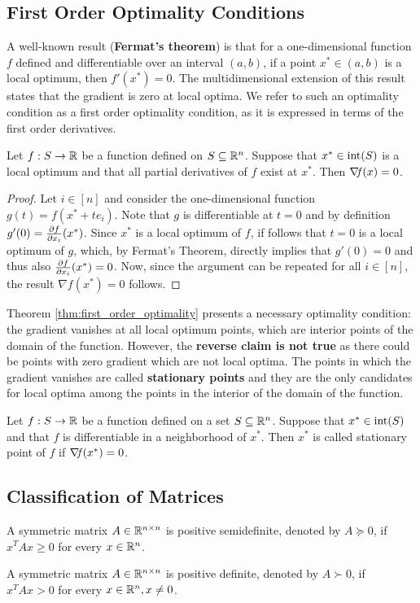 \documentclass[10pt,a4paper]{article}
\begin{document}
\subsection{First Order Optimality Conditions}
\par A well-known result (\textbf{Fermat's theorem}) is that for a one-dimensional function $f$ defined and differentiable over an interval $(a, b)$, if a point $x^*\in (a, b)$ is a local optimum, then $f'(x^*) = 0$. The multidimensional extension of this result states that the gradient is zero at local optima. We refer to such an optimality condition as a first order optimality condition, as it is expressed in terms of the first order derivatives.
\begin{theorem}\label{thm:first_order_optimality}
	Let $f:S\to \mathbb{R}$ be a function defined on $S\subseteq \mathbb{R}^n$. Suppose that $x^*\in\mathord{\mathrm{int}}(S)$ is a local optimum and that all partial derivatives of $f$ exist at $x^*$. Then $\operatorname*{\mathit{\nabla \!f}}(x)=0$.
\end{theorem}
\begin{proof}
	Let $i\in [n]$ and consider the one-dimensional function $g(t)=f(x^*+te_i)$. Note that $g$ is differentiable at $t=0$ and by definition $g'(0) = \frac{\partial f}{\partial x_i}(x^*)$. Since $x^*$ is a local optimum of $f$, if follows that $t=0$ is a local optimum of $g$, which, by Fermat's Theorem, directly implies that $g'(0) = 0$ and thus also $\frac{\partial f}{\partial x_i}(x^*)=0$. Now, since the argument can be repeated for all $i\in[n]$, the result $\nabla f(x^*) = 0$ follows.
\end{proof}
Theorem \ref{thm:first_order_optimality} presents a necessary optimality condition: the gradient vanishes at all local optimum points, which are interior points of the domain of the function. However, the \textbf{reverse claim is not true} as there could be points with zero gradient which are not local optima. The points in which the gradient vanishes are called \textbf{stationary points} and they are the only candidates for local optima among the points in the interior of the domain of the function.
\begin{definition}
	Let $f:S\to \mathbb{R}$ be a function defined on a set $S\subseteq \mathbb{R}^n$. Suppose that $x^* \in \mathord{\mathrm{int}}(S)$ and that $f$ is differentiable in a neighborhood of $x^*$. Then $x^*$ is called stationary point of $f$ if $\operatorname*{\mathit{\nabla \!f}}(x^*)=0$.
\end{definition}
\subsection{Classification of Matrices}
\begin{definition}
	A symmetric matrix $A\in \mathbb{R}^{n\times n}$ is positive semidefinite, denoted by $A \succcurlyeq0$, if $x^TAx\geq 0$ for every $x\in \mathbb{R}^n$.
\end{definition}
\begin{definition}
	A symmetric matrix $A\in \mathbb{R}^{n\times n}$ is positive definite, denoted by $A \succ0$, if $x^TAx> 0$ for every $x\in \mathbb{R}^n, x\neq 0$.
\end{definition}
\end{document}
